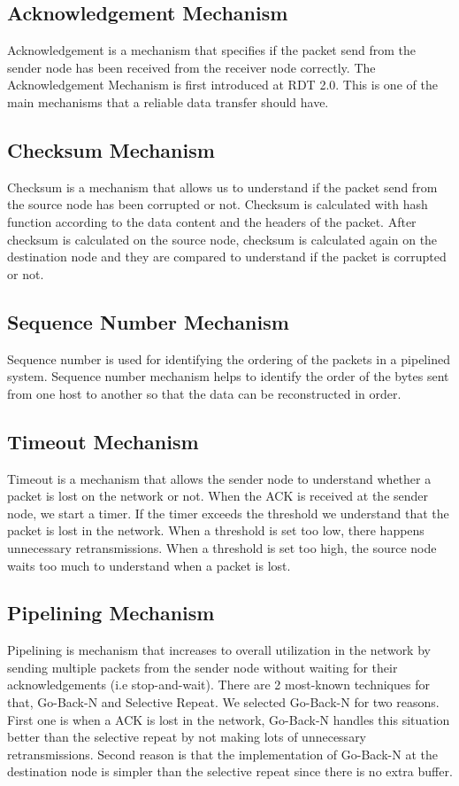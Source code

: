 \documentclass[conference]{IEEEtran}
\begin{document}
\subsection{Acknowledgement Mechanism}
Acknowledgement is a mechanism that specifies if the packet send from the sender node has been received from the receiver node correctly. The Acknowledgement Mechanism is first introduced at RDT 2.0. This is one of the main mechanisms that a reliable data transfer should have.
\subsection{Checksum Mechanism}
Checksum is a mechanism that allows us to understand if the packet send from the source node has been corrupted or not. Checksum is calculated with hash function according to the data content and the headers of the packet. After checksum is calculated on the source node, checksum is calculated again on the destination node and they are compared to understand if the packet is corrupted or not.
\subsection{Sequence Number Mechanism}
Sequence number is used for identifying the ordering of the packets in a pipelined system. Sequence number mechanism helps to identify the order of the bytes sent from one host to another so that the data can be reconstructed in order.
\subsection{Timeout Mechanism}
Timeout is a mechanism that allows the sender node to understand whether a packet is lost on the network or not. When the ACK is received at the sender node, we start a timer. If the timer exceeds the threshold we understand that the packet is lost in the network. When a threshold is set too low, there happens unnecessary retransmissions.  When a threshold is set too high, the source node waits too much to understand when a packet is lost. 
\subsection{Pipelining Mechanism}
Pipelining is mechanism that increases to overall utilization in the network by sending multiple packets from the sender node without waiting for their acknowledgements (i.e  stop-and-wait). There are 2 most-known techniques for that, Go-Back-N and Selective Repeat. We selected Go-Back-N for two reasons. First one is when a ACK is lost in the network, Go-Back-N handles this situation better than the selective repeat by not making lots of unnecessary retransmissions. Second reason is that the implementation of Go-Back-N at the destination node is simpler than the selective repeat since there is no extra buffer.
\end{document}

